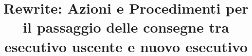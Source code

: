 

\title{Rewrite: Azioni e Procedimenti per il passaggio delle consegne tra esecutivo uscente e nuovo esecutivo}


\usepackage{pdfpages}


